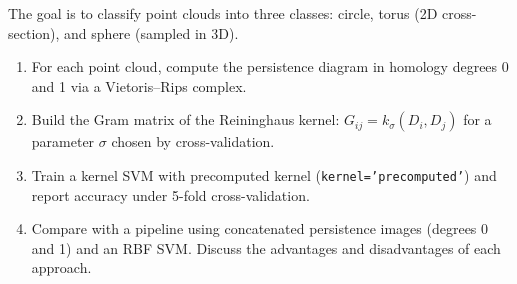 \begin{exercise}
The goal is to classify point clouds into three classes: circle,
torus (2D cross-section), and sphere (sampled in 3D).
\begin{enumerate}
  \item For each point cloud, compute the persistence diagram in
        homology degrees 0 and 1 via a Vietoris--Rips complex.
  \item Build the Gram matrix of the Reininghaus kernel:
        $G_{ij} = k_\sigma(D_i, D_j)$ for a parameter $\sigma$ chosen
        by cross-validation.
  \item Train a kernel SVM with precomputed kernel
        (\texttt{kernel='precomputed'}) and report accuracy under
        5-fold cross-validation.
  \item Compare with a pipeline using concatenated persistence images
        (degrees 0 and 1) and an RBF SVM. Discuss the advantages and
        disadvantages of each approach.
\end{enumerate}
\end{exercise}
